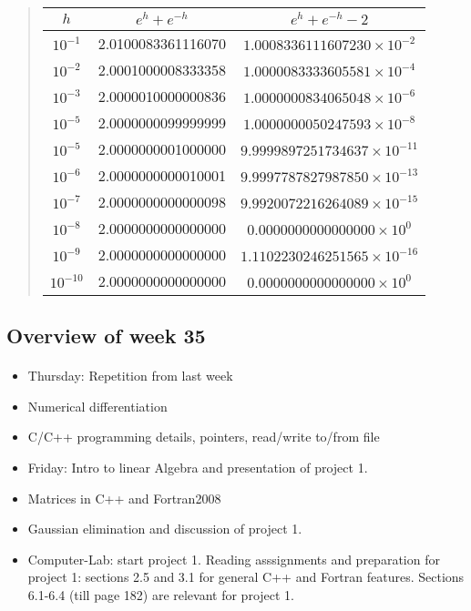 \documentclass[%
oneside,                 %
final,                   %
10pt]{article}
\begin{document}
\begin{quote}
\begin{tabular}{ccc}
\hline
\multicolumn{1}{c}{ $h$ } & \multicolumn{1}{c}{ $e^{h}+e^{-h}$ } & \multicolumn{1}{c}{ $e^{h}+e^{-h}-2$ } \\
\hline
$10^{-1}$  & 2.0100083361116070 & $1.0008336111607230\times 10^{-2}$  \\
$10^{-2}$  & 2.0001000008333358 & $1.0000083333605581\times 10^{-4}$  \\
$10^{-3}$  & 2.0000010000000836 & $1.0000000834065048\times 10^{-6}$  \\
$10^{-5}$  & 2.0000000099999999 & $1.0000000050247593\times 10^{-8}$  \\
$10^{-5}$  & 2.0000000001000000 & $9.9999897251734637\times 10^{-11}$ \\
$10^{-6}$  & 2.0000000000010001 & $9.9997787827987850\times 10^{-13}$ \\
$10^{-7}$  & 2.0000000000000098 & $9.9920072216264089\times 10^{-15}$ \\
$10^{-8}$  & 2.0000000000000000 & $0.0000000000000000\times 10^{0}$   \\
$10^{-9}$  & 2.0000000000000000 & $1.1102230246251565\times 10^{-16}$ \\
$10^{-10}$ & 2.0000000000000000 & $0.0000000000000000\times 10^{0}$   \\
\hline
\end{tabular}
\end{quote}

\noindent



\subsection*{Overview of week 35}


\paragraph{}
\begin{itemize}
  \item Thursday: Repetition from last week

  \item Numerical differentiation

  \item C/C++ programming details, pointers, read/write to/from file

  \item Friday: Intro to linear Algebra and presentation of project 1.

  \item Matrices in C++ and Fortran2008

  \item Gaussian elimination and discussion of project 1.

  \item Computer-Lab: start project 1. Reading asssignments and preparation for project 1: sections 2.5 and 3.1 for general C++ and Fortran features. Sections 6.1-6.4 (till page 182) are relevant for project 1.
\end{itemize}
\end{document}
